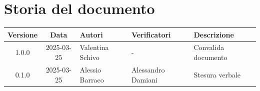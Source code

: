 \section*{Storia del documento}
\begin{tabularx}{\textwidth}{ c c p{2.75cm} p{2.75cm} X }
    \rowcolor{gray!20}\rule{0pt}{0.5cm}\textbf{Versione} & \textbf{Data} & \textbf{Autori} & \textbf{Verificatori} & \textbf{Descrizione} \\[0.7ex]
    \hline
    \rule{0pt}{0.5cm}1.0.0 & 2025-03-25 & Valentina Schivo & - & Convalida documento\\[0.7ex]
    \hline
    \rule{0pt}{0.5cm}0.1.0 & 2025-03-25 & Alessio Barraco & Alessandro Damiani & Stesura verbale\\[0.7ex]
\end{tabularx}